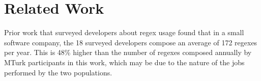 \section{Related Work}



Prior work that surveyed developers about regex usage found that in a small software company, the 18 surveyed developers compose an average of 172 regexes per year. This is 48\% higher than the number of regexes composed annually by MTurk participants in this work, which may be due to the nature of the jobs performed by the two populations. 